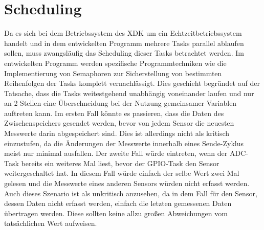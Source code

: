 \section{Scheduling}\label{sec:Scheduling}
Da es sich bei dem Betriebssystem des \acs{XDK} um ein Echtzeitbetriebssystem handelt und in dem entwickelten Programm mehrere Tasks parallel ablaufen sollen, muss zwangsläufig das Scheduling dieser Tasks betrachtet werden. Im entwickelten Programm werden spezifische Programmtechniken wie die Implementierung von Semaphoren zur Sicherstellung von bestimmten Reihenfolgen der Tasks komplett vernachlässigt. Dies geschieht begründet auf der Tatsache, dass die Tasks weitestgehend unabhängig voneinander laufen und nur an 2 Stellen eine Überschneidung bei der Nutzung gemeinsamer Variablen auftreten kann.\newline
\newline
Im ersten Fall könnte es passieren, dass die Daten des Zwischenspeichers gesendet werden, bevor von jedem Sensor die neuesten Messwerte darin abgespeichert sind. Dies ist allerdings nicht als kritisch einzustufen, da die Änderungen der Messwerte innerhalb eines Sende-Zyklus meist nur minimal ausfallen.\newline
Der zweite Fall würde eintreten, wenn der \acs{ADC}-Task bereits ein weiteres Mal liest, bevor der \acs{GPIO}-Task den Sensor weitergeschaltet hat. In diesem Fall würde einfach der selbe Wert zwei Mal gelesen und die Messwerte eines anderen Sensors würden nicht erfasst werden. Auch dieses Szenario ist als unkritisch anzusehen, da in dem Fall für den Sensor, dessen Daten nicht erfasst werden, einfach die letzten gemessenen Daten übertragen werden. Diese sollten keine allzu großen Abweichungen vom tatsächlichen Wert aufweisen.
